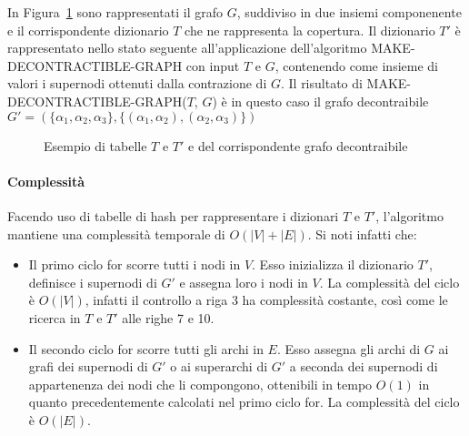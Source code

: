 

In Figura~\ref{fig:make_decontractible_graph_example} sono rappresentati il grafo $G$, suddiviso in due insiemi
componenente e il corrispondente dizionario $T$ che ne rappresenta la copertura. Il dizionario $T\mathcal{'}$ \`e
rappresentato nello stato seguente all'applicazione dell'algoritmo MAKE-DECONTRACTIBLE-GRAPH con input $T$ e $G$,
contenendo come insieme di valori i supernodi ottenuti dalla contrazione di $G$.
Il risultato di MAKE-DECONTRACTIBLE-GRAPH($T$, $G$) \`e in questo caso il grafo decontraibile
$G'=(\{\alpha_1, \alpha_2, \alpha_3\}, \{(\alpha_1, \alpha_2), (\alpha_2, \alpha_3)\})$

\begin{figure}[H]
    \centering
    
    \vspace{-30pt}
    \caption{Esempio di tabelle $T$ e $T'$ e del corrispondente grafo decontraibile}
    \label{fig:make_decontractible_graph_example}
\end{figure}

\paragraph{Complessità}
Facendo uso di tabelle di hash per rappresentare i dizionari $T$ e $T'$, l'algoritmo mantiene una complessit\`a
temporale di $O(|V| + |E|)$.
Si noti infatti che:
\begin{itemize}
    \item Il primo ciclo for scorre tutti i nodi in $V$.
    Esso inizializza il dizionario $T'$, definisce i supernodi di $G'$ e assegna loro i nodi in $V$.
    La complessità del ciclo è $O(|V|)$, infatti il controllo a riga 3 ha complessità costante,
    così come le ricerca in $T$ e $T'$ alle righe 7 e 10.
    \item Il secondo ciclo for scorre tutti gli archi in $E$.
    Esso assegna gli archi di $G$ ai grafi dei supernodi di $G'$ o ai superarchi di $G'$ a seconda dei supernodi
    di appartenenza dei nodi che li compongono, ottenibili in tempo $O(1)$ in quanto precedentemente calcolati nel
    primo ciclo for. La complessit\`a del ciclo \`e $O(|E|)$.
\end{itemize}